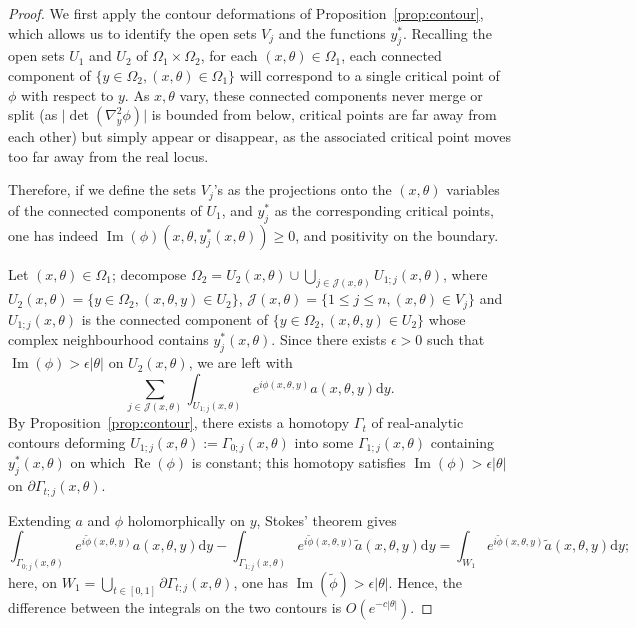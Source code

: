 \documentclass[AHL,Unicode,longabstracts,published]{cedram}
\DeclareMathOperator{\re}{Re}
\DeclareMathOperator{\im}{Im}
\newcommand{\clJ}{\mathcal{J}}
\newcommand\1{\mathds{1}}
\newcommand{\dd}{\mathrm{d}}
\begin{document}
\begin{proof}
We first apply the contour deformations of Proposition~\ref{prop:contour}, which allows us to identify the open sets $V_j$ and the functions $y^*_j$. Recalling the open sets $U_1$ and $U_2$ of $\Omega_1\times \Omega_2$, for each $(x,\theta)\in \Omega_1$, each connected component of $\{y\in \Omega_2,(x,\theta)\in \Omega_1\}$ will correspond to a single critical point of $\phi$ with respect to $y$. As $x,\theta$ vary, these connected components never merge or split (as $\lvert\det(\nabla^2_y\phi)|$ is bounded from below, critical points are far away from each other) but simply appear or disappear, as the associated critical point moves too far away from the real locus.

Therefore, if we define the sets $V_j$'s as the projections onto the $(x,\theta)$ variables of the connected components of $U_1$, and $y^*_j$ as the corresponding critical points, one has indeed $\im(\phi)(x,\theta,y_j^*(x,\theta))\geq 0$, and positivity on the boundary.

Let $(x,\theta)\in \Omega_1$; decompose $\Omega_2=U_2(x,\theta)\cup
\bigcup_{j\in \clJ(x,\theta)}U_{1;j}(x,\theta)$, where $U_2(x,\theta)=\{y\in \Omega_2,(x,\theta,y)\in U_2\}$, $\clJ(x,\theta)=\{1\leq j\leq n, (x,\theta)\in V_j\}$ and $U_{1;j}(x,\theta)$ is the connected component of $\{y\in
\Omega_2,(x,\theta,y)\in U_2\}$ whose complex neighbourhood contains $y_j^*(x,\theta)$. Since there exists $\epsilon>0$ such that $\im(\phi)>\epsilon|\theta|$ on $U_2(x,\theta)$, we are left with
\[
\sum_{j\in
\clJ(x,\theta)}\int_{U_{1;j}(x,\theta)}e^{i\phi(x,\theta,y)}a(x,\theta,y)\dd y.
\]
By Proposition~\ref{prop:contour}, there exists a homotopy $\Gamma_t$ of real-analytic contours deforming $U_{1;j}(x,\theta):=\Gamma_{0;j}(x,\theta)$ into some $\Gamma_{1;j}(x,\theta)$ containing $y^*_j(x,\theta)$ on which $\re(\phi)$ is constant; this homotopy satisfies $\im(\phi)>\epsilon|\theta|$ on $\partial
\Gamma_{t;j}(x,\theta)$.

Extending $a$ and $\phi$ holomorphically on $y$, Stokes' theorem gives
\[
\int_{\Gamma_{0;j}(x,\theta)}e^{i\widetilde{\phi}(x,\theta,y)}a(x,\theta,y)\dd y -
\int_{\Gamma_{1;j}(x,\theta)}e^{i\widetilde{\phi}(x,\theta,y)}\widetilde{a}(x,\theta,y)\dd y=\int_{W_1}e^{i\widetilde{\phi}(x,\theta,y)}\widetilde{a}(x,\theta,y)\dd y;
\]
here, on $W_1=\bigcup_{t\in [0,1]}\partial \Gamma_{t;j}(x,\theta)$, one has $\im(\widetilde{\phi})>\epsilon |\theta|$. Hence, the difference between the integrals on the two contours is $O(e^{-c|\theta|})$.


\end{proof}
\end{document}
